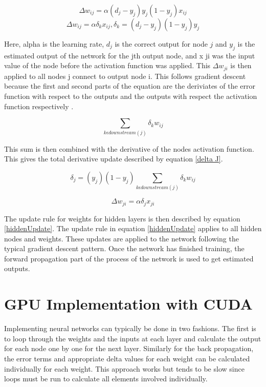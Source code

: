 \documentclass[jair, twoside,11pt,theapa]{article}
\begin{document}
\begin{equation}
\label{fullBP}
\Delta w_{ij} = \alpha (d_j - y_j)y_j(1-y_j)x_{ij} 
\end{equation}
\begin{equation}
\label{delta_k}
\Delta w_{ij} = \alpha \delta_k x_{ij}, \delta_k = (d_j - y_j)(1-y_j)y_j
\end{equation}

Here, alpha is the learning rate, $d_j$ is the correct output for node $j$ and $y_j$ is the estimated output of the network for the jth output node, and x ji was the input value of the node before the activation function was applied. This $\Delta w_{ji}$ is then applied to all nodes j connect to output node i. This follows gradient descent because the first and second parts of the equation are the deriviates of the error function with respect to the outputs and the outputs with respect the activation function respectively \cite{BackProp}.


\begin{equation}
\label{contribError}
\sum_{k \epsilon downstream(j)} \delta_k w_{ij}
\end{equation}

This sum is then combined with the derivative of the nodes activation function. 
This gives the total derivative update described by equation \ref{delta J}.

\begin{equation}
\label{delta J}
\delta_j = (y_j)(1-y_j)\sum_{k \epsilon downstream(j)} \delta_k w_{ij}
\end{equation}

\begin{equation}
\label{hiddenUpdate}
\Delta w_{ji} = \alpha \delta_j x_{ji}
\end{equation}

The update rule for weights for hidden layers is then described by equation \ref{hiddenUpdate}. 
The update rule in equation \ref{hiddenUpdate} applies to all hidden nodes and weights. 
These updates are applied to the network following the typical gradient descent pattern. 
Once the network has finished training, the forward propagation part of the process of the network is used to get estimated outputs.

\section{GPU Implementation with CUDA}
\label{GPU}
Implementing neural networks can typically be done in two fashions. 
The first is to loop through the weights and the inputs at each layer and calculate the output for each node one by one for the next layer. 
Similarly for the back propagation, the error terms and appropriate delta values for each weight can be calculated individually for each weight. 
This approach works but tends to be slow since loops must be run to calculate all elements involved individually. 
\end{document}
